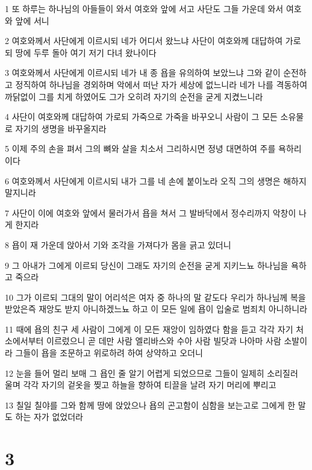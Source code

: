 \par 1 또 하루는 하나님의 아들들이 와서 여호와 앞에 서고 사단도 그들 가운데 와서 여호와 앞에 서니
\par 2 여호와께서 사단에게 이르시되 네가 어디서 왔느냐 사단이 여호와께 대답하여 가로되 땅에 두루 돌아 여기 저기 다녀 왔나이다
\par 3 여호와께서 사단에게 이르시되 네가 내 종 욥을 유의하여 보았느냐 그와 같이 순전하고 정직하여 하나님을 경외하며 악에서 떠난 자가 세상에 없느니라 네가 나를 격동하여 까닭없이 그를 치게 하였어도 그가 오히려 자기의 순전을 굳게 지켰느니라
\par 4 사단이 여호와께 대답하여 가로되 가죽으로 가죽을 바꾸오니 사람이 그 모든 소유물로 자기의 생명을 바꾸올지라
\par 5 이제 주의 손을 펴서 그의 뼈와 살을 치소서 그리하시면 정녕 대면하여 주를 욕하리이다
\par 6 여호와께서 사단에게 이르시되 내가 그를 네 손에 붙이노라 오직 그의 생명은 해하지 말지니라
\par 7 사단이 이에 여호와 앞에서 물러가서 욥을 쳐서 그 발바닥에서 정수리까지 악창이 나게 한지라
\par 8 욥이 재 가운데 앉아서 기와 조각을 가져다가 몸을 긁고 있더니
\par 9 그 아내가 그에게 이르되 당신이 그래도 자기의 순전을 굳게 지키느뇨 하나님을 욕하고 죽으라
\par 10 그가 이르되 그대의 말이 어리석은 여자 중 하나의 말 같도다 우리가 하나님께 복을 받았은즉 재앙도 받지 아니하겠느뇨 하고 이 모든 일에 욥이 입술로 범죄치 아니하니라
\par 11 때에 욥의 친구 세 사람이 그에게 이 모든 재앙이 임하였다 함을 듣고 각각 자기 처소에서부터 이르렀으니 곧 데만 사람 엘리바스와 수아 사람 빌닷과 나아마 사람 소발이라 그들이 욥을 조문하고 위로하려 하여 상약하고 오더니
\par 12 눈을 들어 멀리 보매 그 욥인 줄 알기 어렵게 되었으므로 그들이 일제히 소리질러 울며 각각 자기의 겉옷을 찢고 하늘을 향하여 티끌을 날려 자기 머리에 뿌리고
\par 13 칠일 칠야를 그와 함께 땅에 앉았으나 욥의 곤고함이 심함을 보는고로 그에게 한 말도 하는 자가 없었더라

\chapter{3}

